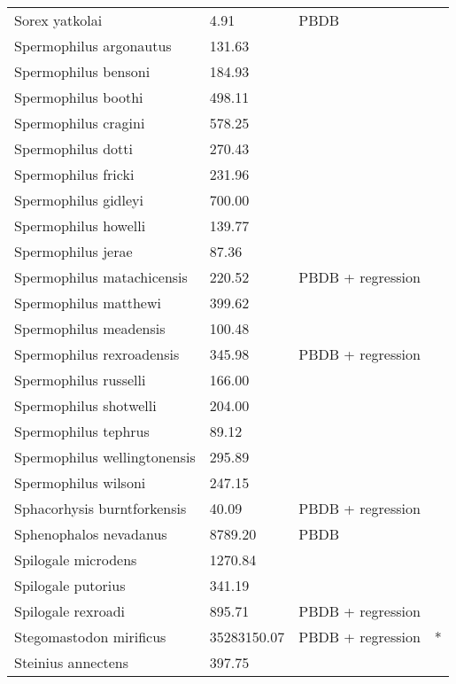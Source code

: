 \documentclass{article}
\begin{document}
\begin{center}
\begin{longtable}{p{} p{} p{} p{}}
    Sorex yatkolai & 4.91 & PBDB &  \\ 
    Spermophilus argonautus & 131.63 & \cite{Tomiya2013} &  \\ 
    Spermophilus bensoni & 184.93 & \cite{Tomiya2013} &  \\ 
    Spermophilus boothi & 498.11 & \cite{Secord2008a} &  \\ 
    Spermophilus cragini & 578.25 & \cite{Tomiya2013} &  \\ 
    Spermophilus dotti & 270.43 & \cite{Tomiya2013} &  \\ 
    Spermophilus fricki & 231.96 & \cite{Simons1960} &  \\ 
    Spermophilus gidleyi & 700.00 & \cite{McKenna2011} &  \\ 
    Spermophilus howelli & 139.77 & \cite{Tomiya2013} &  \\ 
    Spermophilus jerae & 87.36 & \cite{Tomiya2013} &  \\ 
    Spermophilus matachicensis & 220.52 & PBDB + regression &  \\ 
    Spermophilus matthewi & 399.62 & \cite{Beatty2009} &  \\ 
    Spermophilus meadensis & 100.48 & \cite{Tomiya2013} &  \\ 
    Spermophilus rexroadensis & 345.98 & PBDB + regression &  \\ 
    Spermophilus russelli & 166.00 & \cite{McKenna2011} &  \\ 
    Spermophilus shotwelli & 204.00 & \cite{McKenna2011} &  \\ 
    Spermophilus tephrus & 89.12 & \cite{Tomiya2013} &  \\ 
    Spermophilus wellingtonensis & 295.89 & \cite{Tomiya2013} &  \\ 
    Spermophilus wilsoni & 247.15 & \cite{Tomiya2013} &  \\ 
    Sphacorhysis burntforkensis & 40.09 & PBDB + regression &  \\ 
    Sphenophalos nevadanus & 8789.20 & PBDB &  \\ 
    Spilogale microdens & 1270.84 & \cite{Chester2012} &  \\ 
    Spilogale putorius & 341.19 & \cite{Smith2004} &  \\ 
    Spilogale rexroadi & 895.71 & PBDB + regression &  \\ 
    Stegomastodon mirificus & 35283150.07 & PBDB + regression & * \\ 
    Steinius annectens & 397.75 & \cite{Strait2001} &  \\ 

\end{longtable}
\end{center}
\end{document}
